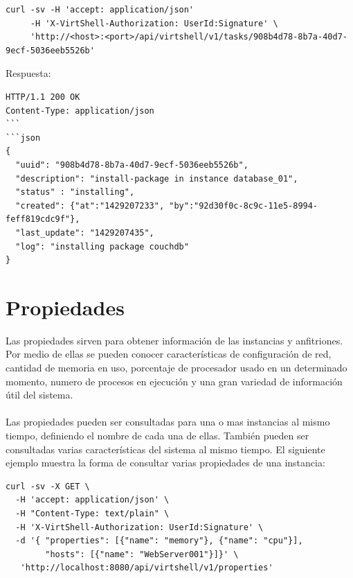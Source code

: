 \vspace{5mm}

\begin{lstlisting}[style=json, caption=Ejemplo de consulta de una tarea]
curl -sv -H 'accept: application/json' 
     -H 'X-VirtShell-Authorization: UserId:Signature' \ 
     'http://<host>:<port>/api/virtshell/v1/tasks/908b4d78-8b7a-40d7-9ecf-5036eeb5526b'
\end{lstlisting}

\vspace{5mm}

Respuesta:

\vspace{5mm}


\begin{lstlisting}[style=json, caption=Ejemplo del detalle de una tarea]
HTTP/1.1 200 OK
Content-Type: application/json
```
```json
{
  "uuid": "908b4d78-8b7a-40d7-9ecf-5036eeb5526b",
  "description": "install-package in instance database_01",
  "status" : "installing",
  "created": {"at":"1429207233", "by":"92d30f0c-8c9c-11e5-8994-feff819cdc9f"},
  "last_update": "1429207435",
  "log": "installing package couchdb"
}
\end{lstlisting}


\section{Propiedades}
Las propiedades sirven para obtener información de las instancias y anfitriones. Por medio de ellas se pueden conocer características de configuración de red, cantidad de memoria en uso, porcentaje de procesador usado en un determinado momento, numero de procesos en ejecución y una gran variedad de información útil del sistema.\\
\\
Las propiedades pueden ser consultadas para una o mas instancias al mismo tiempo, definiendo el nombre de cada una de ellas. También pueden ser consultadas varias características del sistema al mismo tiempo. El siguiente ejemplo muestra la forma de consultar varias propiedades de una instancia:

\vspace{5mm}


\begin{lstlisting}[style=json, caption=Ejemplo consultando varias propiedades a una instancia]
curl -sv -X GET \
  -H 'accept: application/json' \
  -H "Content-Type: text/plain" \
  -H 'X-VirtShell-Authorization: UserId:Signature' \
  -d '{ "properties": [{"name": "memory"}, {"name": "cpu"}],
        "hosts": [{"name": "WebServer001"}]}' \
   'http://localhost:8080/api/virtshell/v1/properties'
\end{lstlisting}


